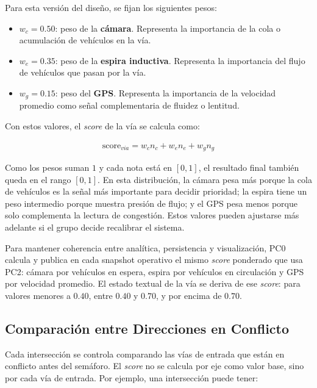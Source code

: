 \documentclass[12pt, a4paper]{article}
\let\oldtexttt\texttt
\renewcommand{\texttt}[1]{\oldtexttt{\seqsplit{#1}}}
\begin{document}
Para esta versión del diseño, se fijan los siguientes pesos:

\begin{itemize}
    \item $w_c = 0.50$: peso de la \textbf{cámara}. Representa la importancia de la cola o acumulación de vehículos en la vía.
    \item $w_e = 0.35$: peso de la \textbf{espira inductiva}. Representa la importancia del flujo de vehículos que pasan por la vía.
    \item $w_g = 0.15$: peso del \textbf{GPS}. Representa la importancia de la velocidad promedio como señal complementaria de fluidez o lentitud.
\end{itemize}

Con estos valores, el \textit{score} de la vía se calcula como:

\begin{align}
    \text{score}_{via} = w_c n_c + w_e n_e + w_g n_g
\end{align}

Como los pesos suman $1$ y cada nota está en $[0,1]$, el resultado final también queda en el rango $[0,1]$. En esta distribución, la cámara pesa más porque la cola de vehículos es la señal más importante para decidir prioridad; la espira tiene un peso intermedio porque muestra presión de flujo; y el GPS pesa menos porque solo complementa la lectura de congestión. Estos valores pueden ajustarse más adelante si el grupo decide recalibrar el sistema.

Para mantener coherencia entre analítica, persistencia y visualización, PC0 calcula y publica en cada snapshot operativo el mismo \textit{score} ponderado que usa PC2: cámara por vehículos en espera, espira por vehículos en circulación y GPS por velocidad promedio. El estado textual de la vía se deriva de ese \textit{score}: \texttt{BAJA} para valores menores a $0.40$, \texttt{NORMAL} entre $0.40$ y $0.70$, y \texttt{ALTA} por encima de $0.70$.

\subsection{Comparación entre Direcciones en Conflicto}

Cada intersección se controla comparando las vías de entrada que están en conflicto antes del semáforo. El \textit{score} no se calcula por eje como valor base, sino por cada vía de entrada. Por ejemplo, una intersección puede tener:
\end{document}
